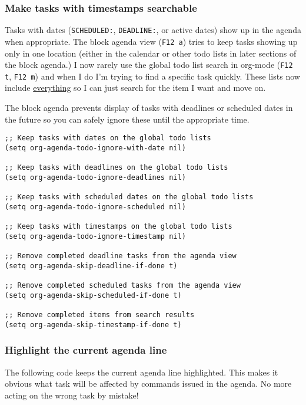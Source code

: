 \documentclass[11pt]{scrartcl}
\begin{document}
\subsubsection{Make tasks with timestamps searchable}
\label{sec:orgheadline11}

Tasks with dates (\texttt{SCHEDULED:}, \texttt{DEADLINE:}, or active dates) show up
in the agenda when appropriate.  The block agenda view (\texttt{F12 a}) tries
to keep tasks showing up only in one location (either in the calendar
or other todo lists in later sections of the block agenda.)  I now
rarely use the global todo list search in org-mode (\texttt{F12 t}, \texttt{F12 m})
and when I do I'm trying to find a specific task quickly.  These lists
now include \uline{everything} so I can just search for the item I want and
move on.

The block agenda prevents display of tasks with deadlines or scheduled
dates in the future so you can safely ignore these until the
appropriate time.
\begin{verbatim}
;; Keep tasks with dates on the global todo lists
(setq org-agenda-todo-ignore-with-date nil)

;; Keep tasks with deadlines on the global todo lists
(setq org-agenda-todo-ignore-deadlines nil)

;; Keep tasks with scheduled dates on the global todo lists
(setq org-agenda-todo-ignore-scheduled nil)

;; Keep tasks with timestamps on the global todo lists
(setq org-agenda-todo-ignore-timestamp nil)

;; Remove completed deadline tasks from the agenda view
(setq org-agenda-skip-deadline-if-done t)

;; Remove completed scheduled tasks from the agenda view
(setq org-agenda-skip-scheduled-if-done t)

;; Remove completed items from search results
(setq org-agenda-skip-timestamp-if-done t)
\end{verbatim}

\subsubsection{Highlight the current agenda line}
\label{sec:orgheadline12}

The following code  keeps the current agenda line highlighted.
This makes it obvious what task will be affected by commands issued in the agenda.
No more acting on the wrong task by mistake!
\end{document}
